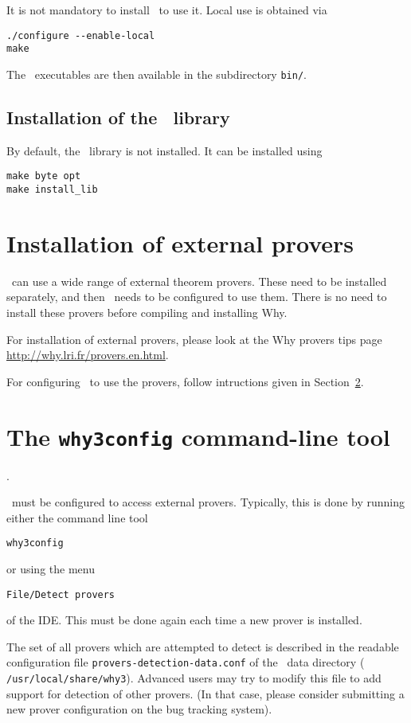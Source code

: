 It is not mandatory to install \why\ to use it. Local use is obtained via
\begin{verbatim}
./configure --enable-local
make
\end{verbatim}
The \why\ executables are then available in the subdirectory \texttt{bin/}.

\subsection{Installation of the \why\ library}
\label{sec:installlib}

By default, the \why\ library is not installed. It can be installed using
\begin{verbatim}
make byte opt
make install_lib
\end{verbatim}

\section{Installation of external provers}

\why\ can use a wide range of external theorem provers. These need to
be installed separately, and then \why\ needs to be configured to use
them. There is no need to install these provers before compiling and
installing Why. 

For installation of external provers, please look at the Why provers
tips page \url{http://why.lri.fr/provers.en.html}.

For configuring \why\ to use the provers, follow intructions given in
Section~\ref{sec:why3config}.

\section{The \texttt{why3config} command-line tool}
\label{sec:why3config}.

\why\ must be configured to access external provers. Typically, this is done
by running either the command line tool
\begin{verbatim}
why3config
\end{verbatim}
or using the menu
\begin{verbatim}
File/Detect provers
\end{verbatim}
of the IDE. This must be done again each time a new prover is installed.

The set of all provers which are attempted to detect is described in
the readable configuration file \texttt{provers-detection-data.conf}
of the \why\ data directory (\eg{}
\texttt{/usr/local/share/why3}). Advanced users may try to modify this
file to add support for detection of other provers. (In that case,
please consider submitting a new prover configuration on the bug
tracking system).

